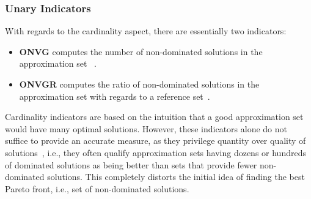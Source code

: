 	
	\subsubsection{Unary Indicators}
	With regards to the cardinality aspect, there are essentially two indicators:
	\begin{itemize}
		\item \textbf{\ac{ONVG}} computes the number of non-dominated solutions in the approximation set ~\cite{Veldhuizen1999GD}.
		\item \textbf{\ac{ONVGR}} computes the ratio of non-dominated solutions in the approximation set with regards to a reference set~\cite{Veldhuizen1999GD}.
	\end{itemize}
	
	Cardinality indicators are based on the intuition that a good approximation set would have many optimal solutions. However, these indicators alone do not suffice to provide an accurate measure, as they privilege quantity over quality of solutions~\cite{Veldhuizen1999GD}, i.e., they often qualify approximation sets having dozens or hundreds of dominated solutions as being better than sets that provide fewer non-dominated solutions. This completely distorts the initial idea of finding the best Pareto front, i.e., set of non-dominated solutions.
	
